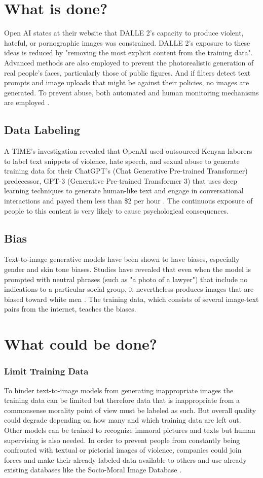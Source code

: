 \documentclass[11pt]{article}
\begin{document}
\section{What is done?}
Open AI states at their website that DALLE 2's capacity to produce violent, hateful, or pornographic images was constrained. DALLE 2's exposure to these ideas is reduced by "removing the most explicit content from the training data". Advanced methods are also employed to prevent the photorealistic generation of real people's faces, particularly those of public figures.
And if filters detect text prompts and image uploads that might be against their policies, no images are generated. To prevent abuse, both automated and human monitoring mechanisms are employed \cite{DallE}. \\
\subsection{Data Labeling}
A TIME's investigation revealed that OpenAI used outsourced Kenyan laborers to label text snippets of violence, hate speech, and sexual abuse to generate training data for their ChatGPT’s (Chat Generative Pre-trained Transformer) predecessor, GPT-3 (Generative Pre-trained Transformer 3) that uses deep learning techniques to generate human-like text and engage in conversational interactions and payed them less than \$2 per hour \cite{KenyaExclusive}. The continuous exposure of people to this content is very likely to cause psychological consequences.
\subsection{Bias}
Text-to-image generative models have been shown to have biases, especially gender and skin tone biases.
Studies have revealed that even when the model is prompted with neutral phrases (such as "a photo of a lawyer") that include no indications to a particular social group, it nevertheless produces images that are biased toward white men \cite{DallEval}.
The training data, which consists of several image-text pairs from the internet, teaches the biases.


\section{What could be done?}
\subsubsection*{Limit Training Data}
To hinder text-to-image models from generating inappropriate images the training data can be limited but therefore data that is inappropriate from a commonsense morality  point of view must be labeled as such. But overall quality could degrade depending on how many and which training data are left out.\\
Other models can be trained to recognize immoral pictures and texts but human supervising is also needed.
In order to prevent people from constantly being confronted with textual or pictorial images of violence, companies could join forces and make their already labeled data available to others and use already existing databases like the Socio-Moral Image Database \cite{Database}.
\end{document}
